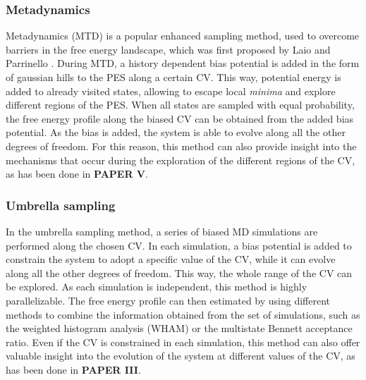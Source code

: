 \subsubsection*{Metadynamics}
Metadynamics (MTD) is a popular enhanced sampling method, used to overcome barriers in the free energy landscape, which was first proposed by Laio and Parrinello \cite{laio2002escaping, barducci2011metadynamics}. During MTD, a history dependent bias potential is added in the form of gaussian hills to the PES along a certain CV. This way, potential energy is added to already visited states, allowing to escape local \textit{minima} and explore different regions of the PES. When all states are sampled with equal probability, the free energy profile along the biased CV can be obtained from the added bias potential. As the bias is added, the system is able to evolve along all the other degrees of freedom. For this reason, this method can also provide insight into the mechanisms that occur during the exploration of the different regions of the CV, as has been done in \textbf{PAPER V}. 

\subsubsection*{Umbrella sampling}
In the umbrella sampling method, a series of biased MD simulations are performed along the chosen CV. In each simulation, a bias potential is added to constrain the system to adopt a specific value of the CV, while it can evolve along all the other degrees of freedom. This way, the whole range of the CV can be explored. As each simulation is independent, this method is highly parallelizable. The free energy profile can then estimated by using different methods to combine the information obtained from the set of simulations, such as the weighted histogram analysis (WHAM) or the multistate Bennett acceptance ratio\cite{kumar1992weighted, torrie1977nonphysical}. Even if the CV is constrained in each simulation, this method can also offer valuable insight into the evolution of the system at different values of the CV, as has been done in \textbf{PAPER III}.

